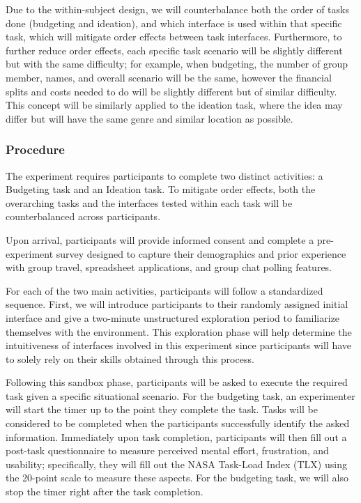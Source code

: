 \documentclass[12pt,a4paper]{article}
\begin{document}
\par
\indent
Due to the within-subject design, we will counterbalance both the order of tasks done (budgeting and ideation), and which interface is used within that specific task, which will mitigate order effects between task interfaces. Furthermore, to further reduce order effects, each specific task scenario will be slightly different but with the same difficulty; for example, when budgeting, the number of group member, names, and overall scenario will be the same, however the financial splits and costs needed to do will be slightly different but of similar difficulty. This concept will be similarly applied to the ideation task, where the idea may differ but will have the same genre and similar location as possible. 


\subsubsection{Procedure}
\par
\indent
The experiment requires participants to complete two distinct activities: a Budgeting task and an Ideation task. To mitigate order effects, both the overarching tasks and the interfaces tested within each task will be counterbalanced across participants.  \newline

\par
\indent
Upon arrival, participants will provide informed consent and complete a pre-experiment survey designed to capture their demographics and prior experience with group travel, spreadsheet applications, and group chat polling features. \newline

\par
\indent
For each of the two main activities, participants will follow a standardized sequence. First, we will introduce participants to their randomly assigned initial interface and give a two-minute unstructured exploration period to familiarize themselves with the environment. This exploration phase will help determine the intuitiveness of interfaces involved in this experiment since participants will have to solely rely on their skills obtained through this process. \newline

\par
\indent
Following this sandbox phase, participants will be asked to execute the required task given a specific situational scenario. For the budgeting task, an experimenter will start the timer up to the point they complete the task. Tasks will be considered to be completed when the participants successfully identify the asked information. Immediately upon task completion, participants will then fill out a post-task questionnaire to measure perceived mental effort, frustration, and usability; specifically, they will fill out the NASA Task-Load Index (TLX) using the 20-point scale to measure these aspects. For the budgeting task, we will also stop the timer right after the task completion. \newline
\end{document}
